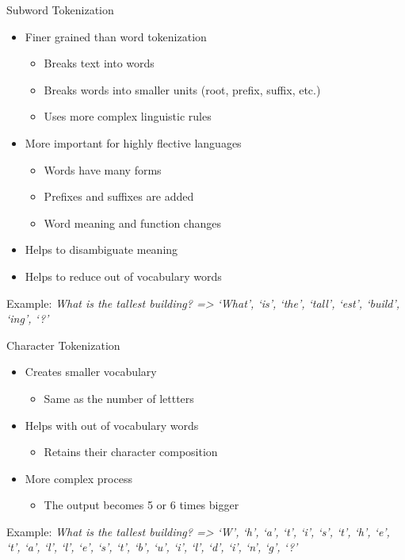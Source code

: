 \begin{vbframe}{Subword Tokenization}

\vfill

\begin{itemize}
	\item Finer grained than word tokenization
		\begin{itemize}
			\item Breaks text into words
			\item Breaks words into smaller units (root, prefix, suffix, etc.)
			\item Uses more complex linguistic rules
		\end{itemize}
	\item More important for highly flective languages
		\begin{itemize}
			\item Words have many forms
			\item Prefixes and suffixes are added
			\item Word meaning and function changes
		\end{itemize}
	\item Helps to disambiguate meaning 
	\item Helps to reduce out of vocabulary words
\end{itemize}

\vskip5mm
Example: \vskip3mm 
{\small\it What is the tallest building? => `What', `is', `the', `tall', `est', `build', `ing', `?'}

\vfill

\end{vbframe}


\begin{vbframe}{Character Tokenization}

\vfill

\begin{itemize}
	\item Creates smaller vocabulary
		\begin{itemize}
			\item Same as the number of lettters
		\end{itemize}
	\item Helps with out of vocabulary words
		\begin{itemize}
			\item Retains their character composition
		\end{itemize}
	\item More complex process
		\begin{itemize}
			\item The output becomes 5 or 6 times bigger
		\end{itemize}
\end{itemize}

\vskip5mm
Example: \vskip3mm 
{\small\it What is the tallest building? => `W', `h', `a', `t', `i', `s', `t', `h', `e', `t', `a', `l', `l', `e', `s', `t', `b', `u', `i', `l', `d', `i', `n', `g', `?'}

\vfill

\end{vbframe}


\endlecture

